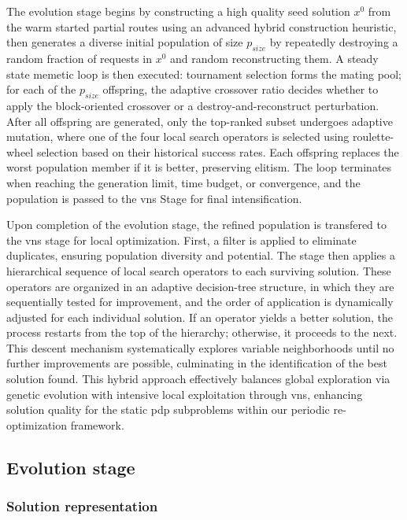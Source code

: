 \documentclass[]{interact}
\begin{document}
The evolution stage begins by constructing a high quality seed solution \(x^0\) from the warm started partial routes using an advanced hybrid construction heuristic, then generates a diverse initial population of size \(p_{size}\) by repeatedly destroying a random fraction of requests in \(x^0\) and random reconstructing them. A steady state memetic loop is then executed: tournament selection forms the mating pool; for each of the \(p_{size}\) offspring, the adaptive crossover ratio decides whether to apply the block-oriented crossover or a destroy-and-reconstruct perturbation. After all offspring are generated, only the top-ranked subset undergoes adaptive mutation, where one of the four local search operators is selected using roulette-wheel selection based on their historical success rates. Each offspring replaces the worst population member if it is better, preserving elitism. The loop terminates when reaching the generation limit, time budget, or convergence, and the population is passed to the \gls{vns} Stage for final intensification.

Upon completion of the evolution stage, the refined population is transfered to the \gls{vns} stage for local optimization. First, a filter is applied to eliminate duplicates, ensuring population diversity and potential. The stage then applies a hierarchical sequence of local search operators to each surviving solution. These operators are organized in an adaptive decision-tree structure, in which they are sequentially tested for improvement, and the order of application is dynamically adjusted for each individual solution. If an operator yields a better solution, the process restarts from the top of the hierarchy; otherwise, it proceeds to the next. This descent mechanism systematically explores variable neighborhoods until no further improvements are possible, culminating in the identification of the best solution found. This hybrid approach effectively balances global exploration via genetic evolution with intensive local exploitation through \gls{vns}, enhancing solution quality for the static \gls{pdp} subproblems within our periodic re-optimization framework.

\subsection{Evolution stage}
\subsubsection{Solution representation}
\end{document}
